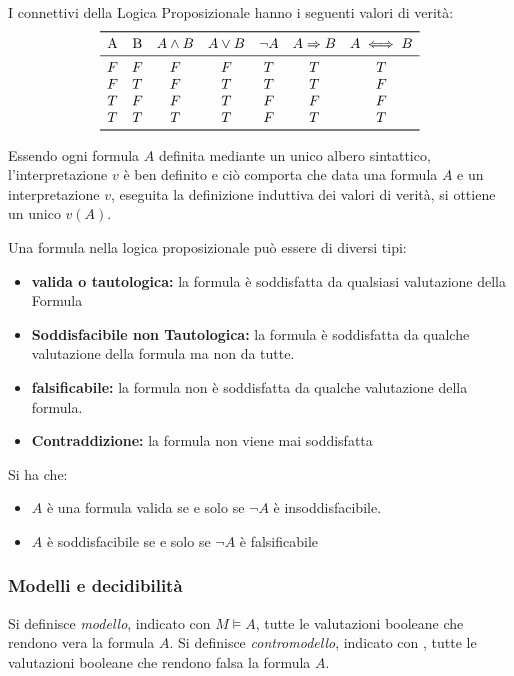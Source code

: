 \documentclass[a4paper,12pt, oneside]{book}
\begin{document}
I connettivi della Logica Proposizionale hanno i seguenti valori di verità:
\[
  \begin{array}{ccccccc}
    \toprule
    \text{A} & \text{B} & A \land B & A \lor B & \neg A & A \Rightarrow B & A \iff B \\
    \midrule
    F & F & F & F & T & T & T \\
    F & T & F & T & T & T & F \\
    T & F & F & T & F & F & F \\
    T & T & T & T & F & T & T \\
    \bottomrule
  \end{array}
\]

Essendo ogni formula $A$ definita mediante un unico albero sintattico,
l'interpretazione $v$ 
è ben definito e ciò comporta che data una formula $A$ e un interpretazione
$v$, 
eseguita la definizione induttiva dei valori di verità, si ottiene un unico
$v(A)$. 

\begin{definizione}
  Una formula nella logica proposizionale può essere di diversi tipi:
  \begin{itemize}
    \item \textbf{valida o tautologica:} la formula è soddisfatta da qualsiasi
    valutazione della Formula 
    \item \textbf{Soddisfacibile non Tautologica:} la formula è soddisfatta da
    qualche valutazione 
    della formula ma non da tutte.
    \item \textbf{falsificabile:} la formula non è soddisfatta da qualche
    valutazione della formula. 
    \item \textbf{Contraddizione:} la formula non viene mai soddisfatta
  \end{itemize}
\end{definizione}

\begin{teorema}
  Si ha che:
  \begin{itemize}
    \item $A$ è una formula valida se e solo se $\neg A$ è insoddisfacibile.
    \item $A$ è soddisfacibile se e solo se $\neg A$ è falsificabile
  \end{itemize}
\end{teorema}


\subsubsection{Modelli e decidibilità}
Si definisce \emph{modello}, indicato con $M \models A$, tutte le valutazioni
booleane 
che rendono vera la formula $A$.
Si definisce \emph{contromodello}, indicato con , tutte le valutazioni booleane
che rendono falsa la formula $A$.
\end{document}
